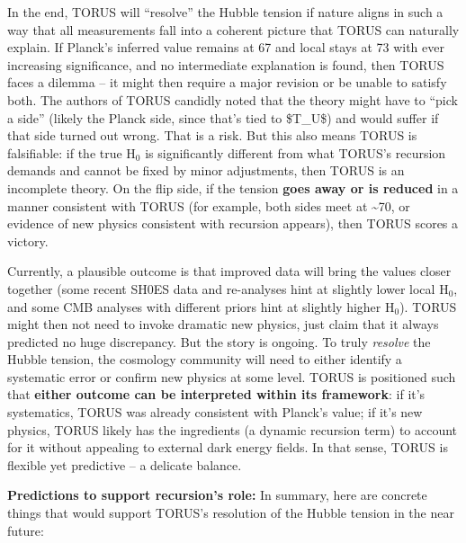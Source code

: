 \documentclass[]{article}
\newcommand{\subscript}[1]{\ensuremath{_{\mathrm{#1}}}}
\begin{document}
In the end, TORUS will ``resolve'' the Hubble tension if nature aligns
in such a way that all measurements fall into a coherent picture that
TORUS can naturally explain. If Planck's inferred value remains at 67
and local stays at 73 with ever increasing significance, and no
intermediate explanation is found, then TORUS faces a dilemma -- it
might then require a major revision or be unable to satisfy both. The
authors of TORUS candidly noted that the theory might have to ``pick a
side'' (likely the Planck side, since that's tied to \$T\_U\$) and would
suffer if that side turned out wrong​. That is a risk. But this also
means TORUS is falsifiable: if the true
H\subscript{0} is
significantly different from what TORUS's recursion demands and cannot
be fixed by minor adjustments, then TORUS is an incomplete theory. On
the flip side, if the tension \textbf{goes away or is reduced} in a
manner consistent with TORUS (for example, both sides meet at
\textasciitilde{}70, or evidence of new physics consistent with
recursion appears), then TORUS scores a victory​.

Currently, a plausible outcome is that improved data will bring the
values closer together (some recent SH0ES data and re-analyses hint at
slightly lower local
H\subscript{0}, and some
CMB analyses with different priors hint at slightly higher
H\subscript{0}). TORUS
might then not need to invoke dramatic new physics, just claim that it
always predicted no huge discrepancy. But the story is ongoing. To truly
\emph{resolve} the Hubble tension, the cosmology community will need to
either identify a systematic error or confirm new physics at some level.
TORUS is positioned such that \textbf{either outcome can be interpreted
within its framework}: if it's systematics, TORUS was already consistent
with Planck's value; if it's new physics, TORUS likely has the
ingredients (a dynamic recursion term) to account for it without
appealing to external dark energy fields. In that sense, TORUS is
flexible yet predictive -- a delicate balance.

\textbf{Predictions to support recursion's role:} In summary, here are
concrete things that would support TORUS's resolution of the Hubble
tension in the near future:
\end{document}
